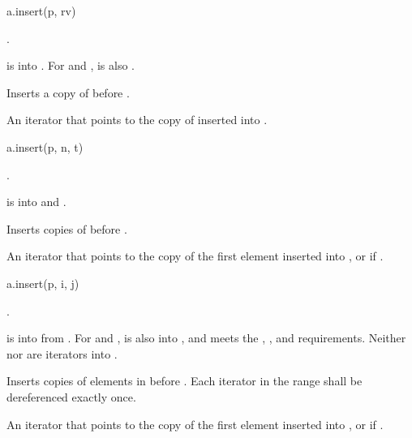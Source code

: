 \begin{itemdecl}
a.insert(p, rv)
\end{itemdecl}

\begin{itemdescr}
\pnum
\result
{}.

\pnum
\expects
{} is  into .
For  and ,
 is also .

\pnum
\effects
Inserts a copy of  before .

\pnum
\returns
An iterator that points to the copy of  inserted into .
\end{itemdescr}

\begin{itemdecl}
a.insert(p, n, t)
\end{itemdecl}

\begin{itemdescr}
\pnum
\result
{}.

\pnum
\expects
{} is  into 
and .

\pnum
\effects
Inserts  copies of  before .

\pnum
\returns
An iterator
that points to the copy of the first element inserted into , or
 if .
\end{itemdescr}

\begin{itemdecl}
a.insert(p, i, j)
\end{itemdecl}

\begin{itemdescr}
\pnum
\result
{}.

\pnum
\expects
{} is  into  from .
For  and ,
 is also
 into ,
and  meets the
,
, and
 requirements.
Neither  nor  are iterators into .

\pnum
\effects
Inserts copies of elements in \tcode{[i, j)} before .
Each iterator in the range  shall be dereferenced exactly once.

\pnum
\returns
An iterator
that points to the copy of the first element inserted into , or
 if .
\end{itemdescr}

